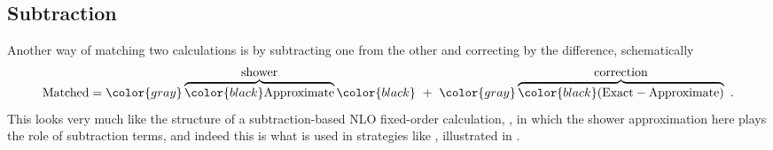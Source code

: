 \subsection{Subtraction}
Another way of matching two calculations is by subtracting one
  from the other and correcting by the difference, schematically
\begin{equation}
\mbox{Matched} =
\color{gray}\overbrace{\color{black}\mbox{Approximate}}^{\mbox{shower}}
\color{black} \ + \ \color{gray}\overbrace{\color{black}
(\mbox{Exact}-\mbox{Approximate})}^{\mbox{correction}}~. \label{eq:additive}
\end{equation}
%
This looks very much like the structure of a subtraction-based NLO
fixed-order calculation, , in which the shower
approximation here plays the role of subtraction terms, and indeed
this is what is used  in 
strategies like \Fw{}
\cite{Frixione:2002ik,Frixione:2003ei,Frixione:2008ym}, illustrated in
.
